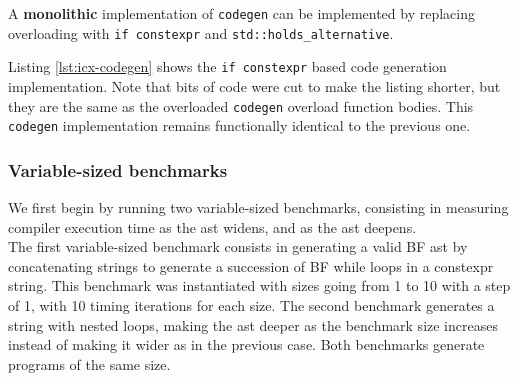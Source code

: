 \documentclass[../main]{subfiles}
\begin{document}
A \textbf{monolithic} implementation of \lstinline{codegen} can be implemented by
replacing overloading with \lstinline{if constexpr} and
\lstinline{std::holds_alternative}.

Listing \ref{lst:icx-codegen} shows the \lstinline{if constexpr} based
code generation implementation. Note that bits of code were cut to make
the listing shorter, but they are the same as the overloaded \lstinline{codegen}
overload function bodies. This \lstinline{codegen} implementation remains
functionally identical to the previous one.

\subsubsection{
  Variable-sized benchmarks
}
\label{lbl:compile-time-eval}

We first begin by running two variable-sized benchmarks, consisting in
measuring compiler execution time as the \gls{ast} widens, and as the \gls{ast}
deepens.
\\

The first variable-sized benchmark consists in generating a valid BF \gls{ast} by
concatenating strings to generate a succession of BF while loops in a
\gls{constexpr} string. This benchmark was instantiated with sizes going from 1 to
10 with a step of 1, with 10 timing iterations for each size.
The second benchmark generates a string with
nested loops, making the \gls{ast} deeper as the benchmark size increases
instead of making it wider as in the previous case. Both benchmarks generate
programs of the same size.
\end{document}
